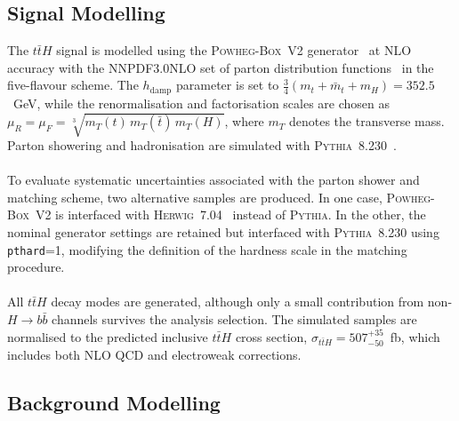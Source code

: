 \subsection{Signal Modelling}
The $t\bar{t}H$ signal is modelled using the \textsc{Powheg-Box}~V2 generator~\cite{powheg-box} at NLO accuracy with the NNPDF3.0NLO set of parton distribution functions~\cite{pdfs_run_2} in the five-flavour scheme. The $h_{\text{damp}}$ parameter is set to $\tfrac{3}{4}(m_{t}+\bar{m}_{t}+m_{H}) = 352.5$~GeV, while the renormalisation and factorisation scales are chosen as $\mu_{R}=\mu_{F}= \sqrt[3]{m_{T}(t)\,m_{T}(\bar{t})\,m_{T}(H)}$, where $m_{T}$ denotes the transverse mass. Parton showering and hadronisation are simulated with \textsc{Pythia}~8.230~\cite{PYTHIA8}.  
\\
\\
To evaluate systematic uncertainties associated with the parton shower and matching scheme, two alternative samples are produced. In one case, \textsc{Powheg-Box}~V2 is interfaced with \textsc{Herwig}~7.04~\cite{herwig} instead of \textsc{Pythia}. In the other, the nominal generator settings are retained but interfaced with \textsc{Pythia}~8.230 using \texttt{pthard}=1, modifying the definition of the hardness scale in the matching procedure.\\
\\
All $t\bar{t}H$ decay modes are generated, although only a small contribution from non-$H\to b\bar{b}$ channels survives the analysis selection. The simulated samples are normalised to the predicted inclusive $t\bar{t}H$ cross section, $\sigma_{t\bar{t}H} = 507^{+35}_{-50}$~fb, which includes both NLO QCD and electroweak corrections.  
\subsection{Background Modelling}
